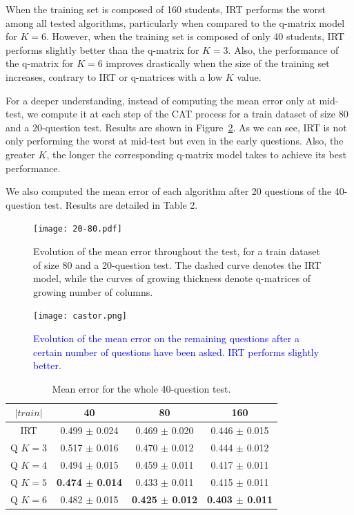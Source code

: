 \documentclass{sig-alternate}
\newcommand\note[1]{\textcolor{blue}{#1}}
\begin{document}
When the training set is composed of 160 students, IRT performs the worst among all tested algorithms, particularly when compared to the q-matrix model for $K = 6$. However, when the training set is composed of only 40 students, IRT performs slightly better than the q-matrix for $K = 3$. Also, the performance of the q-matrix for $K = 6$ improves drastically when the size of the training set increases, contrary to IRT or q-matrices with a low $K$ value.

For a deeper understanding, instead of computing the mean error only at mid-test, we compute it at each step of the CAT process for a train dataset of size 80 and a 20-question test. Results are shown in Figure~\ref{fig:1}. As we can see, IRT is not only performing the worst at mid-test but even in the early questions. Also, the greater $K$, the longer the corresponding q-matrix model takes to achieve its best performance.

We also computed the mean error of each algorithm after 20 questions of the 40-question test. Results are detailed in Table 2.

\begin{figure}
\texttt{[image: 20-80.pdf]}
\caption{Evolution of the mean error throughout the test, for a train dataset of size 80 and a 20-question test. The dashed curve denotes the IRT model, while the curves of growing thickness denote q-matrices of growing number of columns.}
\label{fig:1}
\end{figure}

\begin{figure}
\texttt{[image: castor.png]}
\caption{\note{Evolution of the mean error on the remaining questions after a certain number of questions have been asked. IRT performs slightly better.}}
\label{fig:1}
\end{figure}

\begin{table}[H]
\small\centering\begin{tabular}{@{}cccc@{}}
$|train|$ & 40 & 80 & 160\\
\hline
IRT & 0.499 $\pm$ 0.024 & 0.469 $\pm$ 0.020 & 0.446 $\pm$ 0.015\\
Q $K = 3$ & 0.517 $\pm$ 0.016 & 0.470 $\pm$ 0.012 & 0.444 $\pm$ 0.012\\
Q $K = 4$ & 0.494 $\pm$ 0.015 & 0.459 $\pm$ 0.011 & 0.417 $\pm$ 0.011\\
Q $K = 5$ & \textbf{0.474 $\pm$ 0.014} & 0.433 $\pm$ 0.011 & 0.415 $\pm$ 0.011\\
Q $K = 6$ & 0.482 $\pm$ 0.015 & \textbf{0.425 $\pm$ 0.012} & \textbf{0.403 $\pm$ 0.011}\\
\end{tabular}
\caption{Mean error for the whole 40-question test.}
\label{tab:40q}
\end{table}
\end{document}
